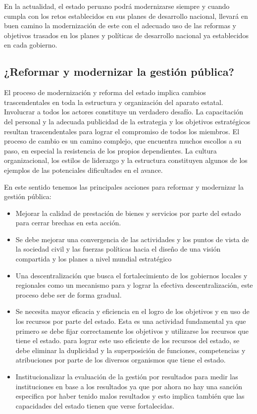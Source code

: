 \documentclass[
  jou,
  floatsintext,
  longtable,
  a4paper,
  nolmodern,
  notxfonts,
  notimes,
  12pt,
  colorlinks=true,linkcolor=blue,citecolor=blue,urlcolor=blue]{apa7}
\providecommand{\tightlist}{%
  \setlength{\itemsep}{0pt}\setlength{\parskip}{0pt}}
\begin{document}
En la actualidad, el estado peruano podrá modernizarse siempre y cuando
cumpla con los retos establecidos en sus planes de desarrollo nacional,
llevará en buen camino la modernización de este con el adecuado uso de
las reformas y objetivos trasados en los planes y políticas de
desarrollo nacional ya establecidos en cada gobierno.

\subsection{¿Reformar y modernizar la gestión
pública?}\label{reformar-y-modernizar-la-gestiuxf3n-puxfablica}

El proceso de modernización y reforma del estado implica cambios
trascendentales en toda la estructura y organización del aparato
estatal. Involucrar a todos los actores constituye un verdadero desafío.
La capacitación del personal y la adecuada publicidad de la estrategia y
los objetivos estratégicos resultan trascendentales para lograr el
compromiso de todos los miembros. El proceso de cambio es un camino
complejo, que encuentra muchos escollos a su paso, en especial la
resistencia de los propios dependientes. La cultura organizacional, los
estilos de liderazgo y la estructura constituyen algunos de los ejemplos
de las potenciales dificultades en el avance.

En este sentido tenemos las principales acciones para reformar y
modernizar la gestión pública:

\begin{itemize}
\tightlist
\item
  Mejorar la calidad de prestación de bienes y servicios por parte del
  estado para cerrar brechas en esta acción.
\item
  Se debe mejorar una convergencia de las actividades y los puntos de
  vista de la sociedad civil y las fuerzas políticas hacia el diseño de
  una visión compartida y los planes a nivel mundial estratégico
\item
  Una descentralización que busca el fortalecimiento de los gobiernos
  locales y regionales como un mecanismo para y lograr la efectiva
  descentralización, este proceso debe ser de forma gradual.
\item
  Se necesita mayor eficacia y eficiencia en el logro de los objetivos y
  en uso de los recursos por parte del estado. Esta es una actividad
  fundamental ya que primero se debe fijar correctamente los objetivos y
  utilizarse los recursos que tiene el estado. para lograr este uso
  eficiente de los recursos del estado, se debe eliminar la duplicidad y
  la superposición de funciones, competencias y atribuciones por parte
  de los diversos organismos que tiene el estado.
\item
  Institucionalizar la evaluación de la gestión por resultados para
  medir las instituciones en base a los resultados ya que por ahora no
  hay una sanción especifica por haber tenido malos resultados y esto
  implica también que las capacidades del estado tienen que verse
  fortalecidas.
\end{itemize}
\end{document}
